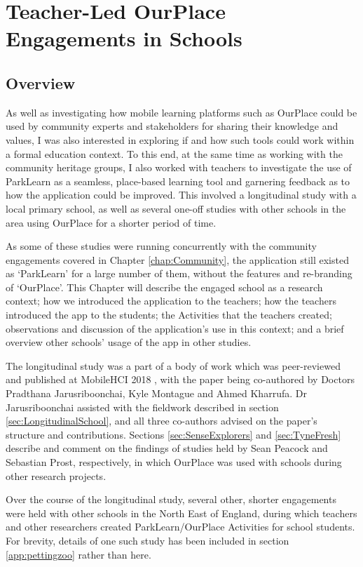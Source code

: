\chapter{Teacher-Led OurPlace Engagements in Schools}
\label{chap:Teachers}

\section{Overview}

As well as investigating how mobile learning platforms such as OurPlace could be used by community experts and stakeholders for sharing their knowledge and values, I was also interested in exploring if and how such tools could work within a formal education context. To this end, at the same time as working with the community heritage groups, I also worked with teachers to investigate the use of ParkLearn as a seamless, place-based learning tool and garnering feedback as to how the application could be improved. This involved a longitudinal study with a local primary school, as well as several one-off studies with other schools in the area using OurPlace for a shorter period of time. 

As some of these studies were running concurrently with the community engagements covered in Chapter \ref{chap:Community}, the application still existed as `ParkLearn' for a large number of them, without the features and re-branding of `OurPlace'. This Chapter will describe the engaged school as a research context; how we introduced the application to the teachers; how the teachers introduced the app to the students; the Activities that the teachers created; observations and discussion of the application's use in this context; and a brief overview other schools' usage of the app in other studies.

The longitudinal study was a part of a body of work which was peer-reviewed and published at MobileHCI 2018 \citep{Richardson2018}, with the paper being co-authored by Doctors Pradthana Jarusriboonchai, Kyle Montague and Ahmed Kharrufa. Dr Jarusriboonchai assisted with the fieldwork described in section \ref{sec:LongitudinalSchool}, and all three co-authors advised on the paper's structure and contributions. Sections \ref{sec:SenseExplorers} and \ref{sec:TyneFresh} describe and comment on the findings of studies held by Sean Peacock and Sebastian Prost, respectively, in which OurPlace was used with schools during other research projects. 

Over the course of the longitudinal study, several other, shorter engagements were held with other schools in the North East of England, during which teachers and other researchers created ParkLearn/OurPlace Activities for school students. For brevity, details of one such study has been included in section \ref{app:pettingzoo} rather than here. 

